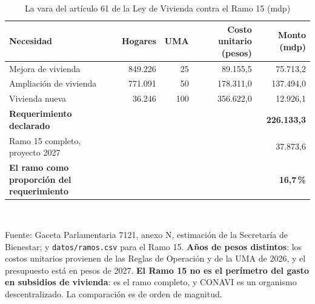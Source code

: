 \begin{table}[htbp]\centering\footnotesize
\caption{La vara del artículo 61 de la Ley de Vivienda contra el Ramo 15 (mdp)}\label{cua:vivienda}
\begin{tabular}{lrrrr}
\toprule
Necesidad & Hogares & UMA & Costo unitario (pesos) & Monto (mdp) \\
\midrule
Mejora de vivienda & 849.226 & 25 & 89.155,5 & 75.713,2 \\
Ampliación de vivienda & 771.091 & 50 & 178.311,0 & 137.494,0 \\
Vivienda nueva & 36.246 & 100 & 356.622,0 & 12.926,1 \\
\midrule \textbf{Requerimiento declarado} & & & & \textbf{226.133,3} \\
Ramo 15 completo, proyecto 2027 & & & & 37.873,6 \\
\textbf{El ramo como proporción del requerimiento} & & & & \textbf{16,7\,\%} \\
\bottomrule
\end{tabular}
\\[2pt]\begin{minipage}{0.92\textwidth}\scriptsize Fuente: Gaceta Parlamentaria 7121, anexo N, estimación de la Secretaría de Bienestar; y \texttt{datos/ramos.csv} para el Ramo 15. \textbf{Años de pesos distintos}: los costos unitarios provienen de las Reglas de Operación y de la UMA de 2026, y el presupuesto está en pesos de 2027. \textbf{El Ramo 15 no es el perímetro del gasto en subsidios de vivienda}: es el ramo completo, y CONAVI es un organismo descentralizado. La comparación es de orden de magnitud.\end{minipage}
\end{table}
